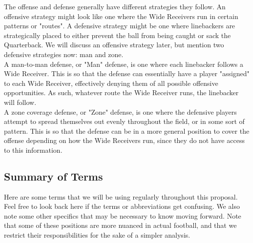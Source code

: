 The offense and defense generally have different strategies they follow. An offensive strategy might look like one where the Wide Receivers run in certain patterns or "routes". A defensive strategy might be one where linebackers are strategically placed to either prevent the ball from being caught or sack the Quarterback. We will discuss an offensive strategy later, but mention two defensive strategies now: man and zone. \\ 

A man-to-man defense, or "Man" defense, is one where each linebacker follows a Wide Receiver. This is so that the defense can essentially have a player "assigned" to each Wide Receiver, effectively denying them of all possible offensive opportunities. As such, whatever route the Wide Receiver runs, the linebacker will follow.\\

A zone coverage defense, or "Zone" defense, is one where the defensive players attempt to spread themselves out evenly throughout the field, or in some sort of pattern. This is so that the defense can be in a more general position to cover the offense depending on how the Wide Receivers run, since they do not have access to this information. 

\subsection{Summary of Terms}

\quad Here are some terms that we will be using regularly throughout this proposal. Feel free to look back here if the terms or abbreviations get confusing. We also note some other specifics that may be necessary to know moving forward. Note that some of these positions are more nuanced in actual football, and that we restrict their responsibilities for the sake of a simpler analysis.

